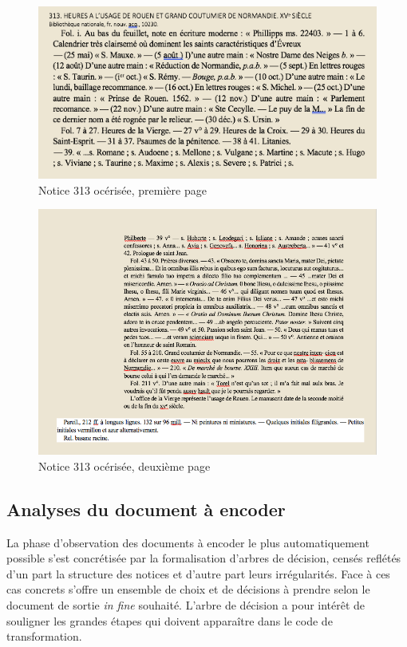 \documentclass[a4paper,12pt,twoside]{book}
\begin{document}
	\begin{figure}[!h]
    \centering
    \includegraphics[width=15cm]{img/Notices_Leroquais/Notice313/OCR/noticeOCR_313_1.png}
    \caption{Notice 313 océrisée, première page}
    \end{figure}
    \clearpage
    
    \begin{figure}[!h]
    \centering
    \includegraphics[width=15cm]{img/Notices_Leroquais/Notice313/OCR/notice_OCR_313_2.png}
    \caption{Notice 313 océrisée, deuxième page}
    \end{figure}
    \clearpage
	
	\subsection{Analyses du document à encoder}
	
	La phase d'observation des documents à encoder le plus automatiquement possible s'est concrétisée par la formalisation d'arbres de décision, censés reflétés d'un part la structure des notices et d'autre part leurs irrégularités. Face à ces cas concrets s'offre un ensemble de choix et de décisions à prendre selon le document de sortie \textit{in fine} souhaité. L'arbre de décision a pour intérêt de souligner les grandes étapes qui doivent apparaître dans le code de transformation. 
	
\end{document}

